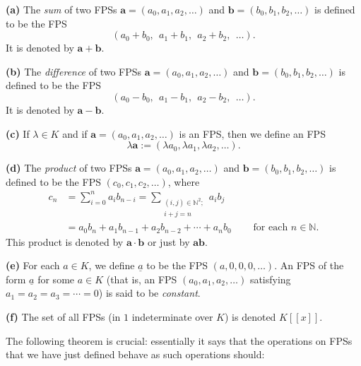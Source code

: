 \begin{definition}
\label{def.fps.ops}\textbf{(a)} The \emph{sum} of two FPSs $\mathbf{a}=\left(
a_{0},a_{1},a_{2},\ldots\right)  $ and $\mathbf{b}=\left(  b_{0},b_{1}%
,b_{2},\ldots\right)  $ is defined to be the FPS%
\[
\left(  a_{0}+b_{0},\ \ a_{1}+b_{1},\ \ a_{2}+b_{2},\ \ \ldots\right)  .
\]
It is denoted by $\mathbf{a}+\mathbf{b}$. \medskip

\textbf{(b)} The \emph{difference} of two FPSs $\mathbf{a}=\left(  a_{0}%
,a_{1},a_{2},\ldots\right)  $ and $\mathbf{b}=\left(  b_{0},b_{1},b_{2}%
,\ldots\right)  $ is defined to be the FPS%
\[
\left(  a_{0}-b_{0},\ \ a_{1}-b_{1},\ \ a_{2}-b_{2},\ \ \ldots\right)  .
\]
It is denoted by $\mathbf{a}-\mathbf{b}$. \medskip

\textbf{(c)} If $\lambda\in K$ and if $\mathbf{a}=\left(  a_{0},a_{1}%
,a_{2},\ldots\right)  $ is an FPS, then we define an FPS
\[
\lambda\mathbf{a}:=\left(  \lambda a_{0},\lambda a_{1},\lambda a_{2}%
,\ldots\right)  .
\]


\textbf{(d)} The \emph{product} of two FPSs $\mathbf{a}=\left(  a_{0}%
,a_{1},a_{2},\ldots\right)  $ and $\mathbf{b}=\left(  b_{0},b_{1},b_{2}%
,\ldots\right)  $ is defined to be the FPS $\left(  c_{0},c_{1},c_{2}%
,\ldots\right)  $, where
\begin{align*}
c_{n}  &  =\sum_{i=0}^{n}a_{i}b_{n-i}=\sum_{\substack{\left(  i,j\right)
\in\mathbb{N}^{2};\\i+j=n}}a_{i}b_{j}\\
&  =a_{0}b_{n}+a_{1}b_{n-1}+a_{2}b_{n-2}+\cdots+a_{n}b_{0}%
\ \ \ \ \ \ \ \ \ \ \text{for each }n\in\mathbb{N}.
\end{align*}
This product is denoted by $\mathbf{a}\cdot\mathbf{b}$ or just by
$\mathbf{ab}$. \medskip

\textbf{(e)} For each $a\in K$, we define $\underline{a}$ to be the FPS
$\left(  a,0,0,0,\ldots\right)  $. An FPS of the form $\underline{a}$ for some
$a\in K$ (that is, an FPS $\left(  a_{0},a_{1},a_{2},\ldots\right)  $
satisfying $a_{1}=a_{2}=a_{3}=\cdots=0$) is said to be \emph{constant}.
\medskip

\textbf{(f)} The set of all FPSs (in $1$ indeterminate over $K$) is denoted
$K\left[  \left[  x\right]  \right]  $.
\end{definition}

The following theorem is crucial: essentially it says that the operations on
FPSs that we have just defined behave as such operations should:

